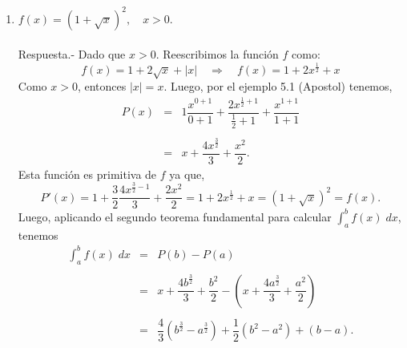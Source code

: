 \begin{enumerate}[\bfseries 1.]
    \item $f(x)=\left(1+\sqrt{x}\right)^2,\quad x>0$.\\\\
	Respuesta.-\; Dado que $x>0$. Reescribimos la función $f$ como:
	$$f(x)=1+2\sqrt{x}+|x| \quad \Rightarrow \quad f(x)=1+2x^{\frac{1}{2}}+x$$
	Como $x>0$, entonces $|x|=x$. Luego, por el ejemplo 5.1 (Apostol) tenemos,
	$$\begin{array}{rcl}
	    P(x)&=&1\dfrac{x^{0+1}}{0+1}+\dfrac{2x^{\frac{1}{2}+1}}{\frac{1}{2}+1}+\dfrac{x^{1+1}}{1+1}\\\\
		&=&x+\dfrac{4x^{\frac{3}{2}}}{3}+\dfrac{x^2}{2}.
	\end{array}$$
	Esta función es primitiva de $f$ ya que,
	$$P'(x)=1+\dfrac{3}{2}\dfrac{4x^{\frac{3}{2}-1}}{3}+\dfrac{2x^2}{2}=1+2x^{\frac{1}{2}}+x=\left(1+\sqrt{x}\right)^2=f(x).$$
	Luego, aplicando el segundo teorema fundamental para calcular $\int_a^b f(x)\; dx$, tenemos
	$$\begin{array}{rcl}
	    \displaystyle\int_a^b f(x)\; dx &=& P(b)-P(a)\\\\
					    &=& x+\dfrac{4b^{\frac{3}{2}}}{3}+\dfrac{b^2}{2}-\left(x+\dfrac{4a^{\frac{3}{2}}}{3}+\dfrac{a^2}{2}\right)\\\\
					    &=& \dfrac{4}{3}\left(b^{\frac{3}{2}}-a^{\frac{3}{2}}\right)+\dfrac{1}{2}\left(b^2-a^2\right)+(b-a).
	\end{array}$$
	\vspace{.5cm}


\end{enumerate}
